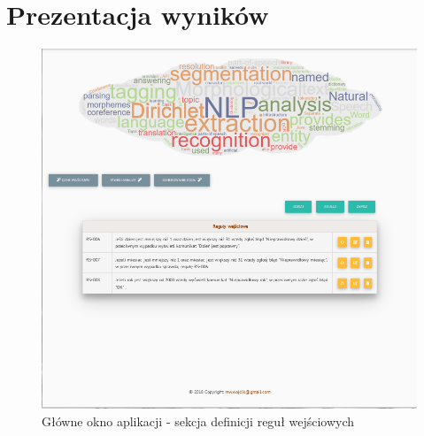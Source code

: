 \section{Prezentacja wyników}

\begin{figure}[H]
	\centering
	\includegraphics[scale=0.7]{img/app/app-we.png}
	\caption{Główne okno aplikacji - sekcja definicji reguł wejściowych}\label{visina8}
\end{figure}

